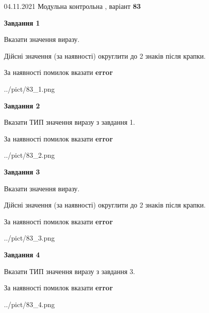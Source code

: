 \documentclass[11pt, ukrainian]{article}
\begin{document}
{04.11.2021 Модульна контрольна , варіант  \No \textbf { 83 }\par}
{
\begin {large}
{\begin {center}\textbf{Завдання 1}\end {center}}\par
Вказати значення виразу. \par
Дійсні значення (за наявності) округлити до 2 знаків після крапки. \par
За наявності помилок вказати \textbf{error}

\begin{center}
	{../pict/83_1.png}
\end{center}
\newpage

{\begin {center}\textbf{Завдання 2}\end {center}}\par
Вказати ТИП значення виразу з завдання 1. \par
За наявності помилок вказати \textbf{error}

\begin{center}
	{../pict/83_2.png}
\end{center}
\newpage

{\begin {center}\textbf{Завдання 3}\end {center}}\par
Вказати значення виразу. \par
Дійсні значення (за наявності) округлити до 2 знаків після крапки. \par
За наявності помилок вказати \textbf{error}

\begin{center}
	{../pict/83_3.png}
\end{center}
\newpage

{\begin {center}\textbf{Завдання 4}\end {center}}\par
Вказати ТИП значення виразу з завдання 3. \par
За наявності помилок вказати \textbf{error}

\begin{center}
	{../pict/83_4.png}
\end{center}
\newpage


\end{large}}
\end{document}
